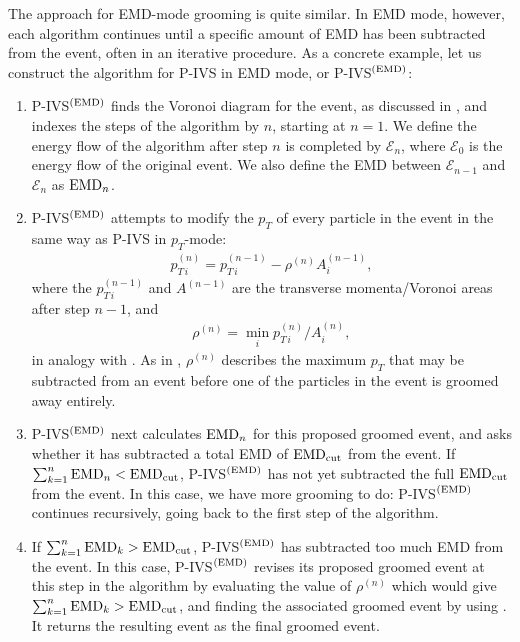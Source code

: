 \documentclass[letterpaper,11pt]{article}
\begin{document}
The approach for EMD-mode grooming is quite similar.
%
In EMD mode, however, each algorithm continues until a specific amount of EMD has been subtracted from the event, often in an iterative procedure.
%
As a concrete example, let us construct the algorithm for P-IVS in EMD mode, or P-IVS\(^{(\rm EMD)}\):
%
\begin{enumerate}
    \item
    P-IVS\(^{(\rm EMD)}\) finds the Voronoi diagram for the event, as discussed in , and indexes the steps of the algorithm by \(n\), starting at \(n=1\).
    We define the energy flow of the algorithm after step \(n\) is completed by \(\mathcal{E}_n\), where \(\mathcal{E}_0\) is the energy flow of the original event.
    We also define the EMD between \(\mathcal{E}_{n-1}\) and \(\mathcal{E}_n\) as \({\rm EMD}_n\).

    \item
    P-IVS\(^{(\rm EMD)}\) attempts to modify the \(p_T\) of every particle in the event in the same way as P-IVS in \(p_T\)-mode:
    \begin{align}
	p_{T\,i}^{(n)} = p_{T\,i}^{(n-1)} - \rho^{(n)} A^{(n-1)}_i,
	\label{eqn:ivs_emd}
    \end{align}
    where the \(p_{T\,i}^{(n-1)}\) and \(A^{(n-1)}\) are the transverse momenta/Voronoi areas after step \(n-1\), and
    \begin{align}
        \rho^{(n)}
        =
        \min_i p^{(n)}_{T\,i}/A^{(n)}_i
        ,
    \end{align}
    in analogy with .
    As in , \(\rho^{(n)}\) describes the maximum \(p_T\) that may be subtracted from an event before one of the particles in the event is groomed away entirely.

    \item
    P-IVS\(^{(\rm EMD)}\) next calculates \({\rm EMD}_n\) for this proposed groomed event, and asks whether it has subtracted a total EMD of \( {\rm EMD}_{\rm cut}\) from the event.
    If \(\sum_{k = 1}^n {\rm EMD}_n < {\rm EMD}_{\rm cut}\), P-IVS\(^{(\rm EMD)}\) has not yet subtracted the full \({\rm EMD}_{\rm cut}\) from the event.
    In this case, we have more grooming to do:
    P-IVS\(^{(\rm EMD)}\) continues recursively, going back to the first step of the algorithm.

    \item
    If \(\sum_{k = 1}^n {\rm EMD}_k > {\rm EMD}_{\rm cut}\), P-IVS\(^{(\rm EMD)}\) has subtracted too much EMD from the event.
    In this case, P-IVS\(^{(\rm EMD)}\) revises its proposed groomed event at this step in the algorithm by evaluating the value of \(\rho^{(n)}\) which would give \(\sum_{k = 1}^n {\rm EMD}_k > {\rm EMD}_{\rm cut}\), and finding the associated groomed event by using .
    It returns the resulting event as the final groomed event.
\end{enumerate}
\end{document}
